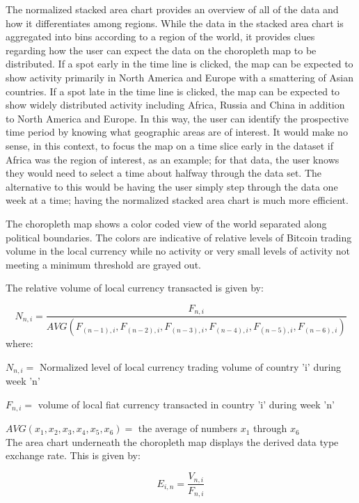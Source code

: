 \documentclass[journal]{vgtc}                %
\begin{document}
The normalized stacked area chart provides an overview of all of the data and how it differentiates among regions.  While the data in the stacked area chart is aggregated into bins according to a region of the world, it provides clues regarding how the user can expect the data on the choropleth map to be distributed.  If a spot early in the time line is clicked, the map can be expected to show activity primarily in North America and Europe with a smattering of Asian countries.  If a spot late in the time line is clicked, the map can be expected to show widely distributed activity including Africa, Russia and China in addition to North America and Europe.  In this way, the user can identify the prospective time period by knowing what geographic areas are of interest.  It would make no sense, in this context, to focus the map on a time slice early in the dataset if Africa was the region of interest, as an example; for that data, the user knows they would need to select a time about halfway through the data set.  The alternative to this would be having the user simply step through the data one week at a time; having the normalized stacked area chart is much more efficient.

The choropleth map shows a color coded view of the world separated along political boundaries.  The colors are indicative of relative levels of Bitcoin trading volume in the local currency while no activity or very small levels of activity not meeting a minimum threshold are grayed out.

The relative volume of local currency transacted is given by:

\begin{equation}\label{key}
N_{n,i} = \frac{F_{n,i}}{AVG(F_{(n-1),i},F_{(n-2),i},F_{(n-3),i},F_{(n-4),i},F_{(n-5),i},F_{(n-6),i})}
\end{equation}
where:

$ N_{n,i} = $ Normalized level of local currency trading volume of country 'i' during week 'n'

$ F_{n,i} = $ volume of local fiat currency transacted in country 'i' during week 'n'

$ AVG(x_{1},x_{2},x_{3},x_{4},x_{5},x_{6}) = $ the average of numbers $ x_{1} $ through $ x_{6} $\\

The area chart underneath the choropleth map displays the derived data type exchange rate.  This is given by:

\begin{equation}\label{key}
E_{i,n} = \frac{ V_{n,i}}{F_{n,i}}
\end{equation}
\end{document}
